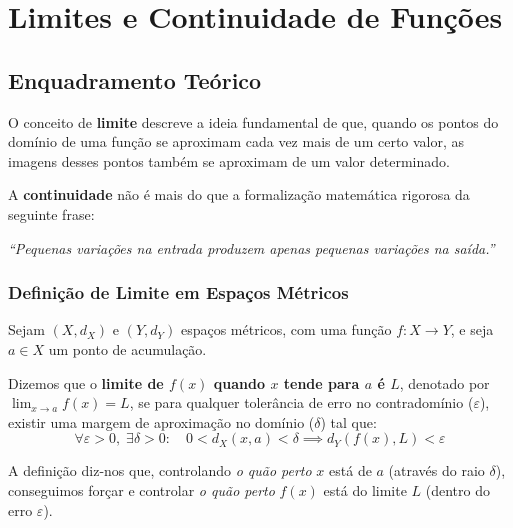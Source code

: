 
\section{Limites e Continuidade de Funções}

\subsection{Enquadramento Teórico}

\begin{notebox}[title={Intuição Geral}]
  O conceito de \textbf{limite} descreve a ideia fundamental de que, quando os pontos do domínio de uma função se aproximam cada vez mais de um certo valor, as imagens desses pontos também se aproximam de um valor determinado.

  A \textbf{continuidade} não é mais do que a formalização matemática rigorosa da seguinte frase:
  \begin{center}
      \textit{``Pequenas variações na entrada produzem apenas pequenas variações na saída.''}
  \end{center}
\end{notebox}

\subsubsection*{Definição de Limite em Espaços Métricos}

Sejam $(X,d_X)$ e $(Y,d_Y)$ espaços métricos, com uma função $f : X \to Y$, e seja $a \in X$ um ponto de acumulação.

\begin{defbox}[title={Limite de uma Função ($\varepsilon-\delta$)}]
  Dizemos que o \textbf{limite de $f(x)$ quando $x$ tende para $a$ é $L$}, denotado por $\lim_{x \to a} f(x) = L$, se para qualquer tolerância de erro no contradomínio ($\varepsilon$), existir uma margem de aproximação no domínio ($\delta$) tal que:
  \[
    \forall \varepsilon > 0, \;\exists \delta > 0 : \quad 0 < d_X(x,a) < \delta \implies d_Y(f(x),L) < \varepsilon
  \]
\end{defbox}

\begin{notebox}[title={Como Interpretar}]
  A definição diz-nos que, controlando \emph{o quão perto} $x$ está de $a$ (através do raio $\delta$), conseguimos forçar e controlar \emph{o quão perto} $f(x)$ está do limite $L$ (dentro do erro $\varepsilon$).
\end{notebox}

